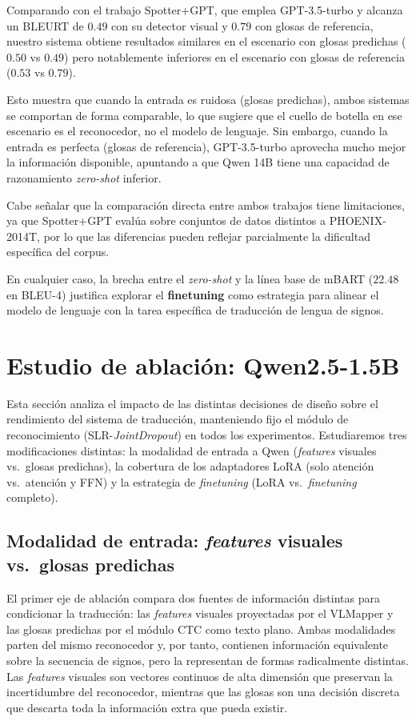 Comparando con el trabajo Spotter+GPT, que emplea GPT-3.5-turbo y alcanza un BLEURT de $0.49$ con su detector visual y $0.79$ con glosas de referencia, nuestro sistema obtiene resultados similares en el escenario con glosas predichas ($0.50$ vs $0.49$) pero notablemente inferiores en el escenario con glosas de referencia ($0.53$ vs $0.79$).

Esto muestra que cuando la entrada es ruidosa (glosas predichas), ambos sistemas se comportan de forma comparable, lo que sugiere que el cuello de botella en ese escenario es el reconocedor, no el modelo de lenguaje.
Sin embargo, cuando la entrada es perfecta (glosas de referencia), GPT-3.5-turbo aprovecha mucho mejor la información disponible, apuntando a que Qwen 14B tiene una capacidad de razonamiento \textit{zero-shot} inferior.

Cabe señalar que la comparación directa entre ambos trabajos tiene limitaciones, ya que Spotter+GPT evalúa sobre conjuntos de datos distintos a PHOENIX-2014T, por lo que las diferencias pueden reflejar parcialmente la dificultad específica del corpus.

En cualquier caso, la brecha entre el \textit{zero-shot} y la línea base de mBART ($22.48$ en BLEU-4) justifica explorar el \textbf{finetuning} como estrategia para alinear el modelo de lenguaje con la tarea específica de traducción de lengua de signos.


\section{Estudio de ablación: Qwen2.5-1.5B}

Esta sección analiza el impacto de las distintas decisiones de diseño sobre el rendimiento del sistema de traducción, manteniendo fijo el módulo de reconocimiento (SLR-\textit{JointDropout}) en todos los experimentos.
Estudiaremos tres modificaciones distintas: la modalidad de entrada a Qwen (\textit{features} visuales vs.\ glosas predichas), la cobertura de los adaptadores LoRA (solo atención vs.\ atención y FFN) y la estrategia de \textit{finetuning} (LoRA vs.\ \textit{finetuning} completo).

\subsection{Modalidad de entrada: \textit{features} visuales vs.\ glosas predichas}

El primer eje de ablación compara dos fuentes de información distintas para condicionar la traducción: las \textit{features} visuales proyectadas por el VLMapper y las glosas predichas por el módulo CTC como texto plano.
Ambas modalidades parten del mismo reconocedor y, por tanto, contienen información equivalente sobre la secuencia de signos, pero la representan de formas radicalmente distintas.
Las \textit{features} visuales son vectores continuos de alta dimensión que preservan la incertidumbre del reconocedor, mientras que las glosas son una decisión discreta que descarta toda la información extra que pueda existir.

